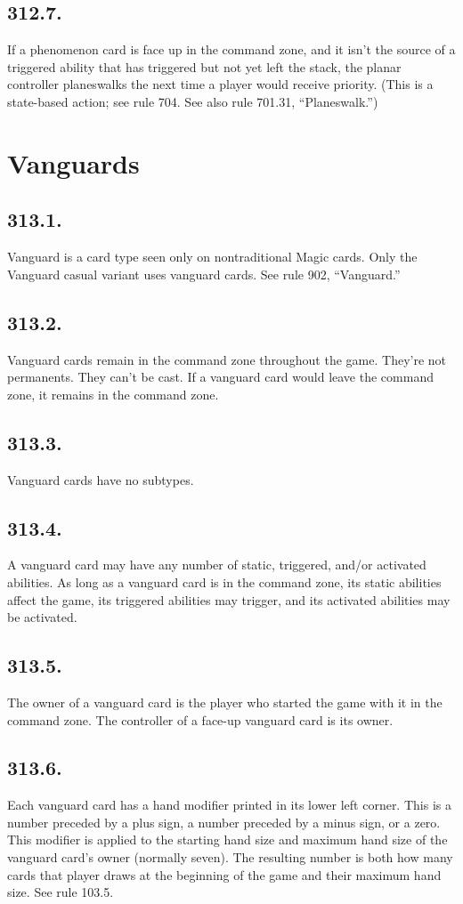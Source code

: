 \subsection*{312.7.}
If a phenomenon card is face up in the command zone, and it isn’t the source of a triggered ability that has triggered but not yet left the stack, the planar controller planeswalks the next time a player would receive priority. (This is a state-based action; see rule 704. See also rule 701.31, “Planeswalk.”)

\section{Vanguards}
\subsection*{313.1.}
Vanguard is a card type seen only on nontraditional Magic cards. Only the Vanguard casual variant uses vanguard cards. See rule 902, “Vanguard.”

\subsection*{313.2.}
Vanguard cards remain in the command zone throughout the game. They’re not permanents. They can’t be cast. If a vanguard card would leave the command zone, it remains in the command zone.

\subsection*{313.3.}
Vanguard cards have no subtypes.

\subsection*{313.4.}
A vanguard card may have any number of static, triggered, and/or activated abilities. As long as a vanguard card is in the command zone, its static abilities affect the game, its triggered abilities may trigger, and its activated abilities may be activated.

\subsection*{313.5.}
The owner of a vanguard card is the player who started the game with it in the command zone. The controller of a face-up vanguard card is its owner.

\subsection*{313.6.}
Each vanguard card has a hand modifier printed in its lower left corner. This is a number preceded by a plus sign, a number preceded by a minus sign, or a zero. This modifier is applied to the starting hand size and maximum hand size of the vanguard card’s owner (normally seven). The resulting number is both how many cards that player draws at the beginning of the game and their maximum hand size. See rule 103.5.

